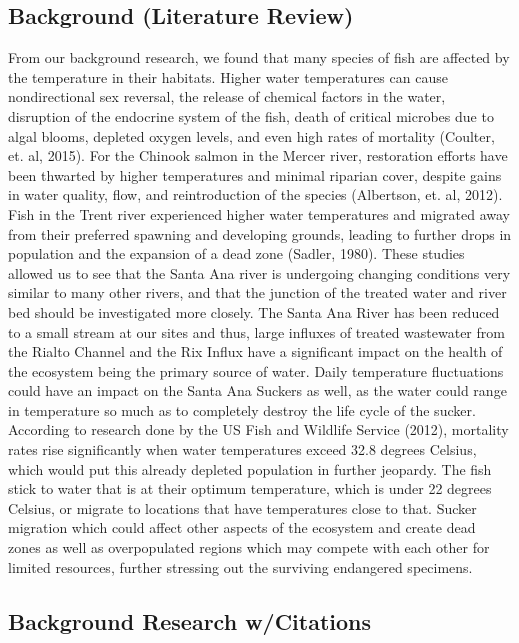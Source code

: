 \documentclass{article}
\begin{document}
\subsection{Background (Literature Review)}
From our background research, we found that many species of fish are affected by the temperature in their habitats. Higher water temperatures can cause nondirectional sex reversal, the release of chemical factors in the water, disruption of the endocrine system of the fish, death of critical microbes due to algal blooms, depleted oxygen levels, and even high rates of mortality (Coulter, et. al, 2015). For the Chinook salmon in the Mercer river, restoration efforts have been thwarted by higher temperatures and minimal riparian cover, despite gains in water quality, flow, and reintroduction of the species (Albertson, et. al, 2012). Fish in the Trent river experienced higher water temperatures and migrated away from their preferred spawning and developing grounds, leading to further drops in population and the expansion of a dead zone (Sadler, 1980). These studies allowed us to see that the Santa Ana river is undergoing changing conditions very similar to many other rivers, and that the junction of the treated water and river bed should be investigated more closely. The Santa Ana River has been reduced to a small stream at our sites and thus, large influxes of treated wastewater from the Rialto Channel and the Rix Influx have a significant impact on the health of the ecosystem being the primary source of water. Daily temperature fluctuations could have an impact on the Santa Ana Suckers as well, as the water could range in temperature so much as to completely destroy the life cycle of the sucker. According to research done by the US Fish and Wildlife Service (2012), mortality rates rise significantly when water temperatures exceed 32.8 degrees Celsius, which would put this already depleted population in further jeopardy. The fish stick to water that is at their optimum temperature, which is under 22 degrees Celsius, or migrate to locations that have temperatures close to that. Sucker migration which could affect other aspects of the ecosystem and create dead zones as well as overpopulated regions which may compete with each other for limited resources, further stressing out the surviving endangered specimens. 

 
\subsection{Background Research w/Citations} 
\end{document}
